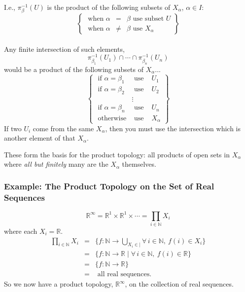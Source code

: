 \documentclass[12pt]{report}
\newcommand{\fall}{\forall\,}
\newcommand{\unionover}[2]{\bigcup_{#1 \in #2 }}
\newcommand{\productover}[2]{\prod_{#1 \in #2}}
\newcommand{\reals}{\mathbb{R}}
\newcommand{\naturals}{\mathbb{N}}
\newcommand{\inv}[1]{#1^{-1}}
\begin{document}
I.e., $\inv{\pi_\beta}(U)$ is the product of the following subsets of
$X_\alpha$, $\alpha \in I$:
\begin{displaymath}
\left\{\begin{array}{lll}
       \textrm{ when } \alpha & = & \beta \textrm{ use subset } U\\
       \textrm{ when } \alpha & \neq & \beta \textrm{ use } X_\alpha
       \end{array}
\right\}
\end{displaymath}\\


Any finite intersection of such elements, 
\begin{displaymath}
\inv{\pi_{\beta_1}}(U_1) \cap \cdots \cap \inv{\pi_{\beta_n}}(U_n)
\end{displaymath}
would be a product of the following subsets of $X_\alpha$...
\begin{displaymath}
\left\{\begin{array}{lll}
       \textrm{ if } \alpha   =  \beta_1 &\textrm{ use }& U_1 \\
       \textrm{ if } \alpha  = \beta_2 & \textrm{ use }& U_2 \\
         &\vdots & \\
       \textrm{ if } \alpha  = \beta_n & \textrm{ use }& U_n \\
       \textrm{ otherwise} & \textrm{ use } & X_\alpha
       \end{array}
\right\}
\end{displaymath}
If two $U_i$ come from the same $X_\alpha$, then you must use the intersection
which is another element of that $X_\alpha$.

These form the basis for the product topology: all products of open sets in
$X_\alpha$ where {\em all but finitely} many are the $X_\alpha$ themselves.\\

\subsubsection{Example: The Product Topology on the Set of Real Sequences}

\begin{displaymath}
\reals^\infty = \reals^1 \times \reals^1 \times \cdots =
\productover{i}{\naturals}X_i
\end{displaymath}
where each $X_i = \reals$.
\begin{eqnarray*}
\productover{i}{\naturals}X_i 
& = & \{f:\naturals \rightarrow \unionover{X_i} 
        \mid \fall i \in \naturals,\ f(i) \in X_i\} \\
& = & \{f: \naturals \rightarrow \reals 
        \mid \fall i \in \naturals,\ f(i) \in \reals\} \\
& = & \{f:\naturals \rightarrow \reals\} \\
& = & \textrm{ all real sequences.}
\end{eqnarray*}
So we now have a product topology, $\reals^\infty$,
on the collection of real sequences.\\
\end{document}
